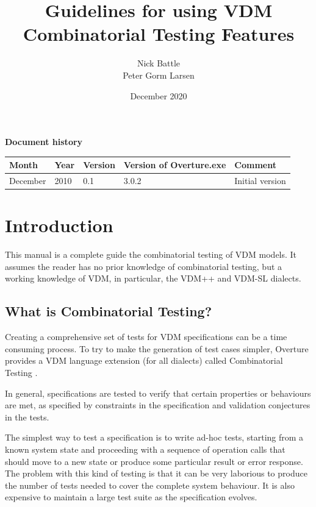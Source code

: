 \documentclass{overturerepchap}
\begin{document}
\title{Guidelines for using VDM Combinatorial Testing Features}
\author{Nick Battle\\
            Peter Gorm Larsen}

\date{December 2020}

\maketitle


{\textbf{Document history}}

\begin{tabular}{|l|l|l|l|l|}\hline
Month   & Year & Version & Version of Overture.exe & Comment \\ \hline
December   & 2010 &    0.1     & 3.0.2   & Initial version\\ \hline
\end{tabular}

\tableofcontents
\newpage
\mbox{}
\newpage
{}
\setcounter{page}{1}

\chapter{Introduction}

This manual is a complete guide the combinatorial testing of VDM models. It
assumes the reader has no prior knowledge of combinatorial testing, but a
working knowledge of VDM, in particular, the VDM++ and VDM-SL dialects.

\section{What is Combinatorial Testing?}

Creating a comprehensive set of tests for VDM specifications can be a time
consuming process. To try to make the generation of test cases simpler, Overture
provides a VDM language extension (for all dialects) called Combinatorial
Testing \cite{Nie&11,Larsen&10c}.

In general, specifications are tested to verify that certain properties or
behaviours are met, as specified by constraints in the specification and
validation conjectures in the tests.

The simplest way to test a specification is to write ad-hoc tests, starting from
a known system state and proceeding with a sequence of operation calls that
should move to a new state or produce some particular result or error response.
The problem with this kind of testing is that it can be very laborious to produce
the number of tests needed to cover the complete system behaviour. It is also
expensive to maintain a large test suite as the specification evolves.
\end{document}
